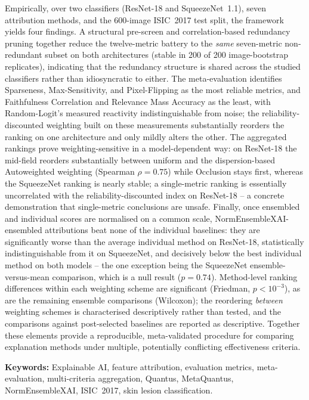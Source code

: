 \documentclass[en,11pt]{aghdpl}  %
\begin{document}
Empirically, over two classifiers (ResNet-18 and SqueezeNet~1.1), seven
attribution methods, and the 600-image ISIC~2017 test split, the framework
yields four findings. A structural pre-screen and correlation-based
redundancy pruning together reduce the twelve-metric battery
to the \emph{same} seven-metric non-redundant subset on both architectures
(stable in 200 of 200 image-bootstrap replicates),
indicating that the redundancy structure is shared across the studied
classifiers rather than idiosyncratic to either. The meta-evaluation
identifies
Sparseness, Max-Sensitivity, and Pixel-Flipping as the most reliable
metrics, and Faithfulness Correlation and Relevance Mass Accuracy as the
least, with Random-Logit's measured reactivity indistinguishable from
noise; the
reliability-discounted weighting built on these measurements substantially
reorders the ranking
on one architecture and only mildly alters the other. The aggregated
rankings prove
weighting-sensitive in a model-dependent way: on ResNet-18 the mid-field
reorders substantially between uniform and the dispersion-based Autoweighted
weighting
(Spearman $\rho = 0.75$) while Occlusion stays first, whereas the SqueezeNet
ranking is nearly stable; a single-metric ranking is essentially
uncorrelated with the reliability-discounted index on ResNet-18 -- a
concrete demonstration that single-metric
conclusions are unsafe.
Finally, once ensembled and individual scores are normalised on a common
scale, NormEnsembleXAI-ensembled attributions beat none of the individual
baselines: they are significantly worse than the average individual method
on ResNet-18, statistically indistinguishable from it on SqueezeNet, and
decisively below the best individual method on both models -- the one
exception being the SqueezeNet ensemble-versus-mean comparison, which is a
null result ($p = 0.74$). Method-level ranking differences within each
weighting scheme are significant (Friedman, $p < 10^{-3}$), as are the
remaining ensemble comparisons (Wilcoxon); the reordering \emph{between}
weighting schemes is characterised descriptively rather than tested, and
the comparisons against post-selected baselines are reported as
descriptive. Together these elements provide a
reproducible, meta-validated procedure for comparing explanation methods
under multiple, potentially conflicting effectiveness criteria.

\vspace{1em}
\noindent\textbf{Keywords:} Explainable AI, feature attribution, evaluation
metrics, meta-evaluation, multi-criteria aggregation, Quantus, MetaQuantus,
NormEnsembleXAI, ISIC~2017, skin lesion classification.
\newpage
\end{document}
